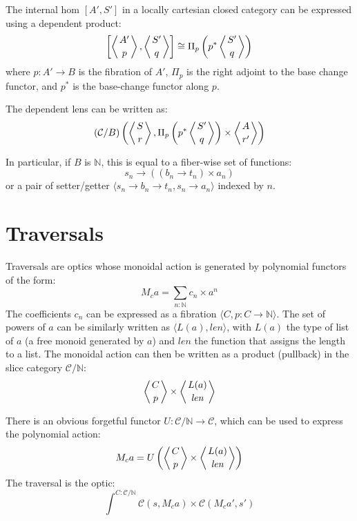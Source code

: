 \documentclass[11pt]{amsart}
\begin{document}
The internal hom $[A', S']$ in a locally cartesian closed category can be expressed using a dependent product:
\[ \left [\left \langle A' \atop p \right \rangle, \left \langle S' \atop q \right \rangle \right ] \cong \Pi_p \left(p^* \left \langle S' \atop q \right \rangle \right)\]
where $p \colon A' \to B$ is the fibration of $A'$, $\Pi_p$ is the right adjoint to the base change functor, and $p^*$ is the base-change functor along $p$.

The dependent lens can be written as:
\[ (\mathcal{C} / B) \left( \left \langle S \atop r \right \rangle, \Pi_p \left(p^* \left \langle S' \atop q \right \rangle \right) \times \left \langle A \atop r' \right \rangle \right) \]

In particular, if $B$ is $\mathbb{N}$, this is equal to a fiber-wise set of functions:
\[s_n \to \left((b_n \to t_n) \times a_n \right) \]
or a pair of setter/getter $\langle s_n \to b_n \to t_n, s_n \to a_n \rangle$ indexed by $n$.

\section{Traversals}

Traversals are optics whose monoidal action is generated by polynomial functors of the form:
\[ M_{c} a = \sum_{n \colon \mathbb{N}} c_n \times a^n \]
The coefficients $c_n$ can be expressed as a fibration $ \langle C, p \colon C \to \mathbb{N} \rangle$. The set of powers of $a$ can be similarly written as $\langle L(a), \mathit{len} \rangle$, with $L(a)$ the type of list of $a$ (a free monoid generated by $a$) and $\mathit{len}$ the function that assigns the length to a list. The monoidal action can then be written as a product (pullback) in the slice category $\mathcal{C}/\mathbb{N}$:
\[ \left \langle {C \atop p} \right \rangle \times \left \langle {L(a) \atop \mathit{len}} \right \rangle \]

There is an obvious forgetful functor $U \colon \mathcal{C}/\mathbb{N} \to \mathcal{C}$, which can be used to express the polynomial action:
\[ M_c a = U\left( 
  \left \langle {C \atop p} \right \rangle \times \left \langle {L(a) \atop \mathit{len}} \right \rangle \right) \]
The traversal is the optic:
\[ \int^{C \colon \mathcal{C}/\mathbb{N}} \mathcal{C} 
\left(s, M_c a \right)  
  \times \mathcal{C}(M_c a', s') \]
\end{document}
